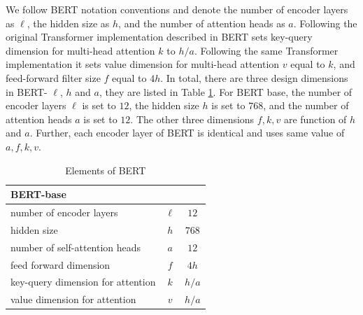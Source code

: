 \documentclass[11pt,a4paper]{article}
\begin{document}
We follow BERT notation conventions and denote the number of encoder layers as $\ell$, the hidden size as $h$, and the number of attention heads as $a$. Following the original Transformer implementation described in \citet{vaswani2017attention} BERT sets key-query dimension for multi-head attention $k$ to $h/a$. Following the same Transformer implementation it sets value dimension for multi-head attention $v$ equal to $k$, and feed-forward filter size $f$ equal to $4h$. In total, there are three design dimensions in BERT- $\ell$, $h$ and $a$, they are listed in Table \ref{tab:elem1}. For BERT base, the number of encoder layers $\ell$ is set to $12$, the hidden size $h$ is set to $768$, and the number of attention heads $a$ is set to $12$. The other three dimensions $f, k, v$ are function of $h$ and $a$. Further, each encoder layer of BERT is identical and uses same value of $a, f, k, v$.
\begin{table}
\begin{center}
\begin{tabular}{lcc}
BERT-base && \\
\hline
number of encoder layers & $\ell$ & $12$ \\
hidden size & $h$ & $768$ \\
number of self-attention heads & $a$ & $12$\\
feed forward dimension & $f$ & $4h$\\
key-query dimension for attention & $k$ & $h/a$\\
value dimension for attention & $v$ & $h/a$\\
\end{tabular}
\end{center}
\caption{\label{tab:elem1} Elements of BERT}
\end{table}
\end{document}
